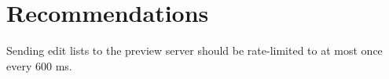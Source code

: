 \documentclass[se,resubmit]{uw-wkrpt}
\begin{document}
\section{Recommendations}
Sending edit lists to the preview server should be rate-limited to at most
once every 600 ms.

\backmatter

%
\printbibliography[heading=bibintoc]
\end{document}
